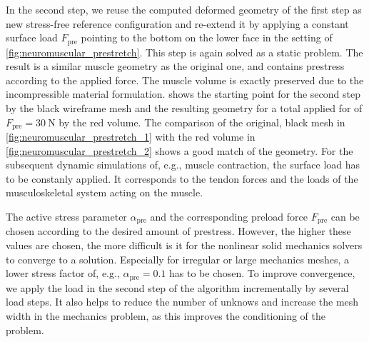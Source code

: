 In the second step, we reuse the computed deformed geometry of the first step as new stress-free reference configuration and re-extend it by applying a constant surface load $F_\text{pre}$ pointing to the bottom on the lower face in the setting of \cref{fig:neuromuscular_prestretch}. This step is again solved as a static problem. The result is a similar muscle geometry as the original one, and contains prestress according to the applied force. The muscle volume is exactly preserved due to the incompressible material formulation.  shows the starting point for the second step by the black wireframe mesh and the resulting geometry for a total applied for of $F_\text{pre}=\SI{30}{\newton}$ by the red volume. The comparison of the original, black mesh in \cref{fig:neuromuscular_prestretch_1} with the red volume in \cref{fig:neuromuscular_prestretch_2} shows a good match of the geometry.
For the subsequent dynamic simulations of, e.g., muscle contraction, the surface load has to be constanly applied. It corresponds to the tendon forces and the loads of the musculoskeletal system acting on the muscle.

The active stress parameter $\alpha_\text{pre}$ and the corresponding preload force $F_\text{pre}$ can be chosen according to the desired amount of prestress. However, the higher these values are chosen, the more difficult is it for the nonlinear solid mechanics solvers to converge to a solution. Especially for irregular or large mechanics meshes, a lower stress factor of, e.g., $\alpha_\text{pre}=0.1$ has to be chosen. To improve convergence, we apply the load in the second step of the algorithm incrementally by several load steps. It also helps to reduce the number of unknows and increase the mesh width in the mechanics problem, as this improves the conditioning of the problem. 
 
